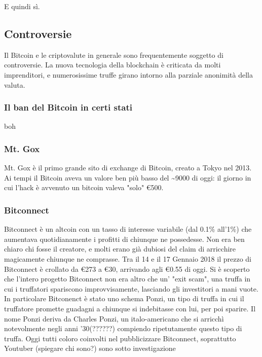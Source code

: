 \documentclass {article}
\begin{document}
{E quindi sì.


\subsection {Controversie}


Il Bitcoin e le criptovalute in generale sono frequentemente soggetto di controversie. La nuova tecnologia della blockchain è criticata da molti imprenditori, e numerosissime truffe girano intorno alla parziale anonimità della valuta.


\subsubsection {Il ban del Bitcoin in certi stati}


boh


\subsubsection {Mt. Gox}


Mt. Gox è il primo grande sito di exchange di Bitcoin, creato a Tokyo nel 2013.
Ai tempi il Bitcoin aveva un valore ben più basso del \textasciitilde 9000 di oggi: il giorno in cui l'hack è avvenuto un bitcoin valeva "solo" \euro{500}.


\subsubsection {Bitconnect}


Bitconnect è un altcoin con un tasso di interesse variabile (dal 0.1\% all'1\%) che aumentava quotidianamente i profitti di chiunque ne possedesse.
Non era ben chiaro chi fosse il creatore, e molti erano già dubiosi del claim di arricchire magicamente chiunque ne comprasse.
Tra il 14 e il 17 Gennaio 2018 il prezzo di Bitconnect è crollato da \euro{273} a \euro{30}, arrivando agli \euro{0.55} di oggi. Si è scoperto che l'intero progetto Bitconnect non era altro che un' "exit scam", una truffa in cui i truffatori spariscono improvvisamente, lasciando gli investitori a mani vuote.
In particolare Bitconenct è stato uno schema Ponzi, un tipo di truffa in cui il truffatore promette guadagni a chiunque si indebitasse con lui, per poi sparire.
Il nome Ponzi deriva da Charles Ponzi, un italo-americano che si arricchì notevolmente negli anni '30(??????) compiendo ripetutamente questo tipo di truffa.
Oggi tutti coloro coinvolti nel pubblicizzare Bitconnect, soprattutto Youtuber (spiegare chi sono?) sono sotto investigazione


}
\end{document}
